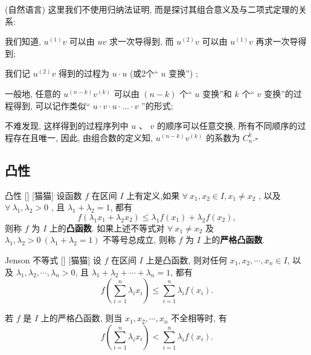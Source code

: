 \documentclass[UTF8]{ctexart}
\begin{document}
			\begin{prf}
				 (自然语言) 这里我们不使用归纳法证明, 而是探讨其组合意义及与二项式定理的关系: 

				我们知道,  \(u^{(1)} v\) 可以由 \(uv\) 求一次导得到, 而 \(u^{(2)} v\) 可以由 \(u^{(1)} v\) 再求一次导得到; 

				我们记 \(u^{(2)} v\) 得到的过程为 \(u \cdot u\)  (或2个“ \(u\) 变换”) ;

				一般地, 任意的 \(u^{(n-k)} v^{(k)}\) 可以由 \((n-k)\) 个“ \(u\) 变换”和 \(k\) 个“ \(v\) 变换”的过程得到, 可以记作类似“ \(u\cdot v \cdot u \cdot \dots \cdot v\) ”的形式; 

				不难发现, 这样得到的过程序列中 \(u\) 、 \(v\) 的顺序可以任意交换, 所有不同顺序的过程存在且唯一, 
				因此, 由组合数的定义知,  \(u^{(n-k)} v^{(k)}\) 的系数为 \(C_{n}^{k}\).\(\square\)
			\end{prf}

			
		\subsection{凸性}
			\begin{dfn}
			    []
			    {凸性}
			    []
			    [猫猫]
				设函数 \(f\) 在区间 \(I\) 上有定义,如果 \(\forall \ x_1, x_2 \in I, x_1 \neq x_2\) , 以及 \( \forall \ \lambda_1, \lambda_2 > 0\) , 且 \(\lambda_1 + \lambda_2 = 1\), 都有
				\[
				f(\lambda_1 x_1 + \lambda_2 x_2) \leq \lambda_1 f(x_1) + \lambda_2 f(x_2),
				\]
				则称 \(f\) 为 \(I\) 上的\textbf{凸函数}. 如果上述不等式对 \(\forall \  x_1 \neq x_2\) 及 \(\lambda_1, \lambda_2 > 0 \ (\lambda_1 + \lambda_2 = 1)\) 不等号总成立, 则称 \(f\) 为 \(I\) 上的\textbf{严格凸函数}.					
			\end{dfn}
			
			\begin{thm}
			    []
			    {Jenson 不等式}
			    []
			    [猫猫]
				设 \(f\) 在区间 \(I\) 上是凸函数, 则对任何 \(x_1, x_2, \cdots, x_n \in I\), 以及 \(\lambda_1, \lambda_2, \cdots, \lambda_n > 0\), 且 \(\lambda_1 + \lambda_2 + \cdots + \lambda_n = 1\), 都有
				\[f\left(\sum_{i=1}^n \lambda_i x_i\right) \leq \sum_{i=1}^n \lambda_i f(x_i). \]

				若 \(f\) 是 \(I\) 上的严格凸函数, 则当 \(x_1, x_2, \cdots, x_n\) 不全相等时, 有
				\[f\left(\sum_{i=1}^n \lambda_i x_i\right) < \sum_{i=1}^n \lambda_i f(x_i). \]
			\end{thm}
\end{document}
